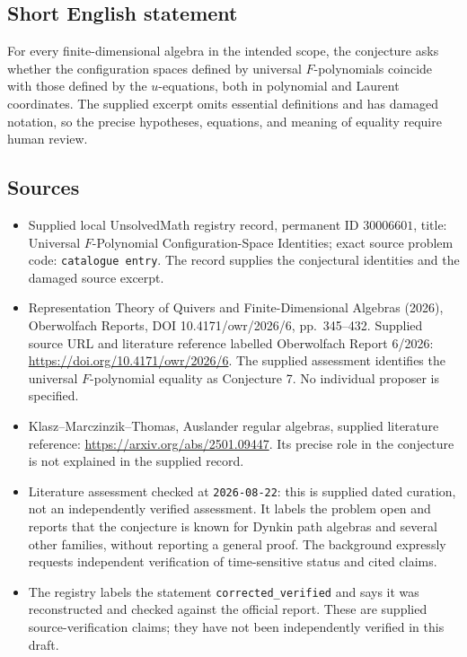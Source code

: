 \documentclass[11pt]{article}
\begin{document}
\subsection{Short English statement}
For every finite-dimensional algebra in the intended scope, the conjecture asks whether the configuration spaces defined by universal \(F\)-polynomials coincide with those defined by the \(u\)-equations, both in polynomial and Laurent coordinates. The supplied excerpt omits essential definitions and has damaged notation, so the precise hypotheses, equations, and meaning of equality require human review.
\subsection{Sources}
\begin{itemize}
\item Supplied local UnsolvedMath registry record, permanent ID \(30006601\), title: Universal \(F\)-Polynomial Configuration-Space Identities; exact source problem code: \texttt{catalogue entry}. The record supplies the conjectural identities and the damaged source excerpt.
\item Representation Theory of Quivers and Finite-Dimensional Algebras (2026), Oberwolfach Reports, DOI 10.4171/owr/2026/6, pp.\ 345--432. Supplied source URL and literature reference labelled Oberwolfach Report 6/2026: \url{https://doi.org/10.4171/owr/2026/6}. The supplied assessment identifies the universal \(F\)-polynomial equality as Conjecture 7. No individual proposer is specified.
\item Klasz--Marczinzik--Thomas, Auslander regular algebras, supplied literature reference: \url{https://arxiv.org/abs/2501.09447}. Its precise role in the conjecture is not explained in the supplied record.
\item Literature assessment checked at \texttt{2026-08-22}: this is supplied dated curation, not an independently verified assessment. It labels the problem open and reports that the conjecture is known for Dynkin path algebras and several other families, without reporting a general proof. The background expressly requests independent verification of time-sensitive status and cited claims.
\item The registry labels the statement \texttt{corrected\_verified} and says it was reconstructed and checked against the official report. These are supplied source-verification claims; they have not been independently verified in this draft.
\end{itemize}
\end{document}
